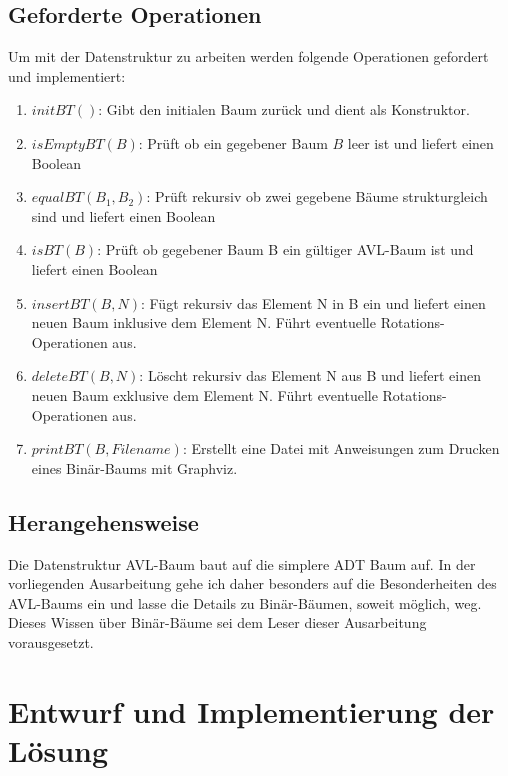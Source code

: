 \documentclass{article}
\begin{document}
	\subsection{Geforderte Operationen}
	
	Um mit der Datenstruktur zu arbeiten werden folgende Operationen gefordert und implementiert:
	
	\begin{enumerate}
		\item $initBT()$: Gibt den initialen Baum zurück und dient als Konstruktor.
		\item $isEmptyBT(B)$: Prüft ob ein gegebener Baum $B$ leer ist und liefert einen Boolean
		\item $equalBT(B_1, B_2)$: Prüft rekursiv ob zwei gegebene Bäume strukturgleich sind und liefert einen Boolean
		\item $isBT(B)$: Prüft ob gegebener Baum B ein gültiger AVL-Baum ist und liefert einen Boolean
		\item $insertBT(B, N)$: Fügt rekursiv das Element N in B ein und liefert einen neuen Baum inklusive dem Element N. Führt eventuelle Rotations-Operationen aus.
		\item $deleteBT(B, N)$: Löscht rekursiv das Element N aus B und liefert einen neuen Baum exklusive dem Element N. Führt eventuelle Rotations-Operationen aus.
		\item $printBT(B, Filename)$: Erstellt eine Datei mit Anweisungen zum Drucken eines Binär-Baums mit Graphviz. 
	\end{enumerate}
	
	\subsection{Herangehensweise}
	
	Die Datenstruktur AVL-Baum baut auf die simplere ADT Baum auf. In der vorliegenden Ausarbeitung gehe ich daher besonders auf die Besonderheiten des AVL-Baums ein und lasse die Details zu Binär-Bäumen, soweit möglich, weg. Dieses Wissen über Binär-Bäume sei dem Leser dieser Ausarbeitung vorausgesetzt.

    
  \newpage
  \section{Entwurf und Implementierung der Lösung}
  
\end{document}
